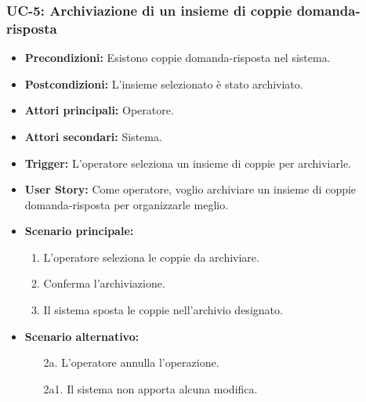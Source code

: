 \documentclass[a4paper, 12pt]{article}
\begin{document}
\subsubsection{UC-5: Archiviazione di un insieme di coppie domanda-risposta}
\begin{itemize}
    \item \textbf{Precondizioni:} Esistono coppie domanda-risposta nel sistema.
    \item \textbf{Postcondizioni:} L'insieme selezionato è stato archiviato.
    \item \textbf{Attori principali:} Operatore.
    \item \textbf{Attori secondari:} Sistema.
    \item \textbf{Trigger:} L'operatore seleziona un insieme di coppie per archiviarle.
    \item \textbf{User Story:} Come operatore, voglio archiviare un insieme di coppie domanda-risposta per organizzarle meglio.
    \item \textbf{Scenario principale:}
    \begin{enumerate}
        \item L'operatore seleziona le coppie da archiviare.
        \item Conferma l'archiviazione.
        \item Il sistema sposta le coppie nell'archivio designato.
    \end{enumerate}
    \item \textbf{Scenario alternativo:}
    \begin{enumerate}
        \item[2a.] L'operatore annulla l'operazione.
        \item[2a1.] Il sistema non apporta alcuna modifica.
    \end{enumerate}
\end{itemize}
\end{document}
